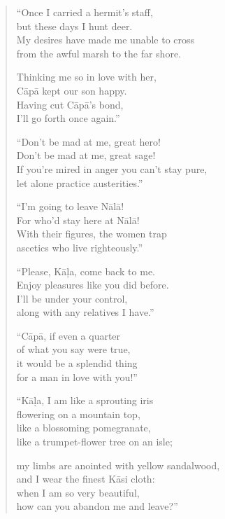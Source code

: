 \documentclass[12pt,openany]{book}%
\begin{document}
\begin{verse}%
“Once I carried a hermit’s staff, \\
but these days I hunt deer. \\
My desires have made me unable to cross \\
from the awful marsh to the far shore. 

Thinking me so in love with her, \\
\textsanskrit{Cāpā} kept our son happy. \\
Having cut \textsanskrit{Cāpā}’s bond, \\
I’ll go forth once again.” 

“Don’t be mad at me, great hero! \\
Don’t be mad at me, great sage! \\
If you’re mired in anger you can’t stay pure, \\
let alone practice austerities.” 

“I’m going to leave \textsanskrit{Nālā}! \\
For who’d stay here at \textsanskrit{Nālā}! \\
With their figures, the women trap \\
ascetics who live righteously.” 

“Please, \textsanskrit{Kāḷa}, come back to me. \\
Enjoy pleasures like you did before. \\
I’ll be under your control, \\
along with any relatives I have.” 

“\textsanskrit{Cāpā}, if even a quarter \\
of what you say were true, \\
it would be a splendid thing \\
for a man in love with you!” 

“\textsanskrit{Kāḷa}, I am like a sprouting iris \\
flowering on a mountain top, \\
like a blossoming pomegranate, \\
like a trumpet-flower tree on an isle; 

my limbs are anointed with yellow sandalwood, \\
and I wear the finest \textsanskrit{Kāsi} cloth: \\
when I am so very beautiful, \\
how can you abandon me and leave?” 


\end{verse}
\end{document}
